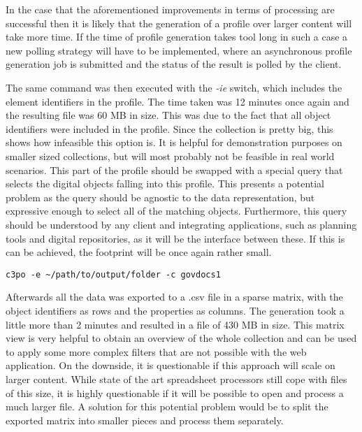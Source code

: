 In the case that the aforementioned improvements in terms of processing are successful then it is likely that the generation of a profile over larger content will take more time.
If the time of profile generation takes tool long in such a case a new polling strategy will have to be implemented, where an asynchronous profile generation job is submitted and the status of the result is polled by the client.

The same command was then executed with the \textit{-ie} switch, which includes the element identifiers in the profile.
The time taken was 12 minutes once again and the resulting file was 60 MB in size.
This was due to the fact that all object identifiers were included in the profile.
Since the collection is pretty big, this shows how infeasible this option is.
It is helpful for demonstration purposes on smaller sized collections, but will most probably not be feasible in real world scenarios.
This part of the profile should be swapped with a special query that selects the digital objects falling into this profile.
This presents a potential problem as the query should be agnostic to the data representation, but expressive enough to select all of the matching objects.
Furthermore, this query should be understood by any client and integrating applications, such as planning tools and digital repositories, as it will be the interface between these.
If this is can be achieved, the footprint will be once again rather small. 


\begin{verbatim}
c3po -e ~/path/to/output/folder -c govdocs1
\end{verbatim}
Afterwards all the data was exported to a .csv file in a sparse matrix, with the object identifiers as rows and the properties as columns.
The generation took a little more than 2 minutes and resulted in a file of 430 MB in size.
This matrix view is very helpful to obtain an overview of the whole collection and can be used to apply some more complex filters that are not possible with the web application.
On the downside, it is questionable if this approach will scale on larger content.
While state of the art spreadsheet processors still cope with files of this size, it is highly questionable if it will be possible to open and process a much larger file.
A solution for this potential problem would be to split the exported matrix into smaller pieces and process them separately.

